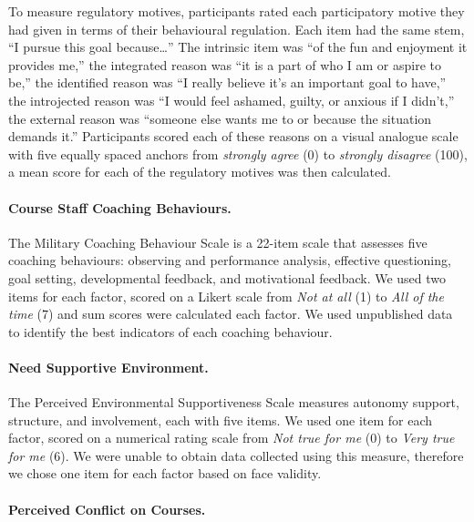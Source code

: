 \documentclass[
  12pt,
  a4paper,
]{book}
\begin{document}
To measure regulatory motives, participants rated each participatory motive they had given in terms of their behavioural regulation. Each item had the same stem, ``I pursue this goal because\ldots{}'' The intrinsic item was ``of the fun and enjoyment it provides me,'' the integrated reason was ``it is a part of who I am or aspire to be,'' the identified reason was ``I really believe it's an important goal to have,'' the introjected reason was ``I would feel ashamed, guilty, or anxious if I didn't,'' the external reason was ``someone else wants me to or because the situation demands it.'' Participants scored each of these reasons on a visual analogue scale with five equally spaced anchors from \emph{strongly agree} (0) to \emph{strongly disagree} (100), a mean score for each of the regulatory motives was then calculated.

\hypertarget{course-staff-coaching-behaviours.}{%
\paragraph{Course Staff Coaching Behaviours.}\label{course-staff-coaching-behaviours.}}

The Military Coaching Behaviour Scale \citep[MCBS;][]{Wagstaff2018} is a 22-item scale that assesses five coaching behaviours: observing and performance analysis, effective questioning, goal setting, developmental feedback, and motivational feedback. We used two items for each factor, scored on a Likert scale from \emph{Not at all} (1) to \emph{All of the time} (7) and sum scores were calculated each factor. We used unpublished data to identify the best indicators of each coaching behaviour.

\hypertarget{need-supportive-environment.}{%
\paragraph{Need Supportive Environment.}\label{need-supportive-environment.}}

The Perceived Environmental Supportiveness Scale \citep[PESS;][]{Markland2010} measures autonomy support, structure, and involvement, each with five items. We used one item for each factor, scored on a numerical rating scale from \emph{Not true for me} (0) to \emph{Very true for me} (6). We were unable to obtain data collected using this measure, therefore we chose one item for each factor based on face validity.

\hypertarget{perceived-conflict-on-courses.}{%
\paragraph{Perceived Conflict on Courses.}\label{perceived-conflict-on-courses.}}
\end{document}
